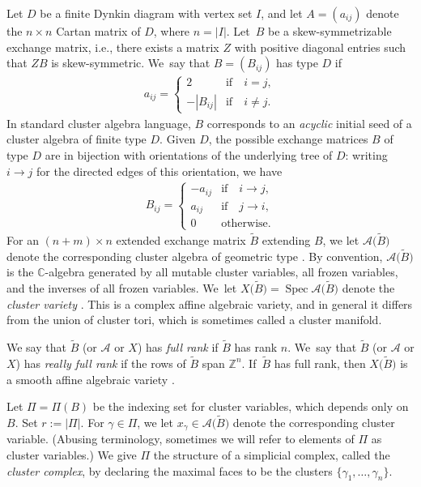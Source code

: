 \documentclass[pdftex]{sigma}%
\def\C{{\mathbb C}}
\def\Z{{\mathbb Z}}
\def\A{{\mathcal{A}}}
\def\Spec{\operatorname{Spec}}
\def\tB{{\tilde B}}
\def\tB{{\tilde B}}
\numberwithin{equation}{section}
\begin{document}
\bigskip{}
Let $D$ be a finite Dynkin diagram with vertex set $I$, and let $A=(a_{ij})$ denote the $n \times n$ Cartan matrix of $D$, where $n = |I|$. Let~$B$ be a skew-symmetrizable exchange matrix, i.e., there exists a matrix $Z$ with positive diagonal entries such that $ZB$ is skew-symmetric. We~say that $B = (B_{ij})$ has type $D$ if
\begin{gather*}
a_{ij} = \begin{cases} 2 & \mbox{if}\quad i = j,
\\
-|B_{ij}| & \mbox{if}\quad i \neq j.
\end{cases}
\end{gather*}
In standard cluster algebra language, $B$ corresponds to an \emph{acyclic} initial seed of a cluster algebra of finite type $D$.
Given $D$, the possible exchange matrices $B$ of type $D$ are in bijection with orientations of the underlying tree of $D$: writing $i \to j$ for the directed edges of this orientation,
we have
\begin{gather*}
B_{ij} = \begin{cases} -a_{ij} & \mbox{if}\quad i \to j,
\\
a_{ij} & \mbox{if}\quad j \to i,
\\
0 & \mbox{otherwise.}
\end{cases}
\end{gather*}
For an $(n+m) \times n$ extended exchange matrix $\tilde B$ extending $B$, we let $\A\big(\tB\big)$ denote the correspon\-ding cluster algebra of geometric type \cite{CA2}. By convention, $\A\big(\tB\big)$ is the $\C$-algebra generated by all mutable cluster variables, all frozen variables, and the inverses of all frozen variables. We~let $X\big(\tB\big) = \Spec\A\big(\tB\big)$ denote the \emph{cluster variety} \cite{LS}. This is a complex affine algebraic variety, and in general it differs from the union of cluster tori, which is sometimes called a cluster manifold.

\bigskip{}
We say that $\tB$ (or $\A$ or $X$) has \emph{full rank} if $\tB$ has rank $n$. We~say that $\tB$ (or $\A$ or $X$) has \emph{really full rank} if the rows of $\tB$ span $\Z^n$. If~$\tB$ has full rank, then $X\big(\tB\big)$ is a smooth affine algebraic variety \cite[Theorem~7.7]{Mul}.

\bigskip{}
Let $\Pi = \Pi(B)$ be the indexing set for cluster variables, which depends only on $B$. Set $r:=|\Pi|$. For $\gamma \in \Pi$, we let $x_\gamma \in \A\big(\tB\big)$ denote the corresponding cluster variable. (Abusing terminology, sometimes we will refer to elements of $\Pi$ as cluster variables.) We give $\Pi$ the structure of a simplicial complex, called the \emph{cluster complex}, by declaring the maximal faces to be the clusters $\{\gamma_1,\dots,\gamma_n\}$.
\end{document}
